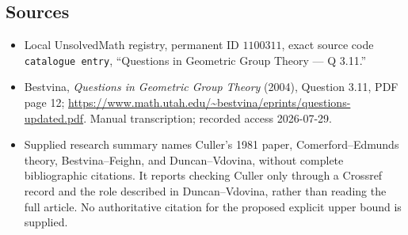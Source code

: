 \documentclass[11pt]{article}
\begin{document}
\subsection{Sources}
\begin{itemize}
\item Local UnsolvedMath registry, permanent ID \(1100311\), exact source code \texttt{catalogue entry}, ``Questions in Geometric Group Theory --- Q 3.11.''
\item Bestvina, \emph{Questions in Geometric Group Theory} (2004), Question 3.11, PDF page 12; \url{https://www.math.utah.edu/~bestvina/eprints/questions-updated.pdf}. Manual transcription; recorded access 2026-07-29.
\item Supplied research summary names Culler's 1981 paper, Comerford--Edmunds theory, Bestvina--Feighn, and Duncan--Vdovina, without complete bibliographic citations. It reports checking Culler only through a Crossref record and the role described in Duncan--Vdovina, rather than reading the full article. No authoritative citation for the proposed explicit upper bound is supplied.
\end{itemize}
\end{document}
